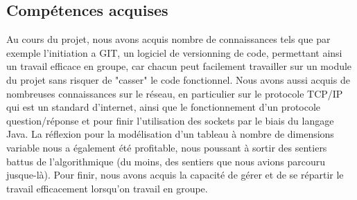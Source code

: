 \subsection{Compétences acquises}
	Au cours du projet, nous avons acquis nombre de connaissances tels que par exemple l'initiation a GIT, un logiciel de versionning de code, permettant ainsi un travail efficace en groupe, car chacun peut facilement travailler sur un module du projet sans risquer de "casser" le code fonctionnel.\newline
	 Nous avons aussi acquis de nombreuses connaissances sur le réseau, en particulier sur le protocole TCP/IP qui est un standard d'internet, ainsi que le fonctionnement d'un protocole question/réponse et pour finir l'utilisation des sockets par le biais du langage Java.\newline
	La réflexion pour la modélisation d'un tableau à nombre de dimensions variable nous a également été profitable, nous poussant à sortir des sentiers battus de l'algorithmique (du moins, des sentiers que nous avions parcouru jusque-là).\newline
	Pour finir, nous avons acquis la capacité de gérer et de se répartir le travail efficacement lorsqu'on travail en groupe.
